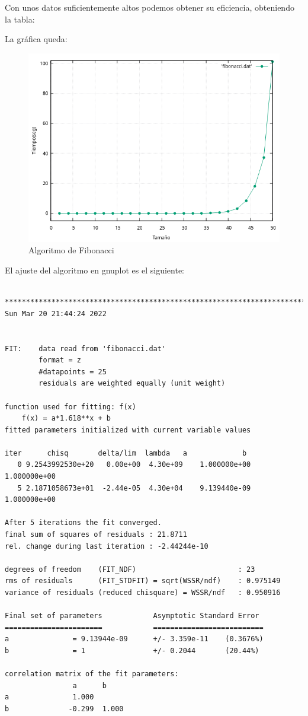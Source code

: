 \documentclass[12pt, spanish]{article}
\begin{document}
Con unos datos suficientemente altos podemos obtener su eficiencia, obteniendo la tabla:



\newpage

La gráfica queda:
\begin{figure}[H]
  \centering
  \includegraphics[scale = 1]{fibonacci.png}
  \caption{Algoritmo de Fibonacci}
\end{figure}

\newpage

El ajuste del algoritmo en gnuplot es el siguiente:

\begin{verbatim}

*************************************************************************
Sun Mar 20 21:44:24 2022


FIT:    data read from 'fibonacci.dat'
        format = z
        #datapoints = 25
        residuals are weighted equally (unit weight)

function used for fitting: f(x)
	f(x) = a*1.618**x + b
fitted parameters initialized with current variable values

iter      chisq       delta/lim  lambda   a             b
   0 9.2543992530e+20   0.00e+00  4.30e+09    1.000000e+00   1.000000e+00
   5 2.1871058673e+01  -2.44e-05  4.30e+04    9.139440e-09   1.000000e+00

After 5 iterations the fit converged.
final sum of squares of residuals : 21.8711
rel. change during last iteration : -2.44244e-10

degrees of freedom    (FIT_NDF)                        : 23
rms of residuals      (FIT_STDFIT) = sqrt(WSSR/ndf)    : 0.975149
variance of residuals (reduced chisquare) = WSSR/ndf   : 0.950916

Final set of parameters            Asymptotic Standard Error
=======================            ==========================
a               = 9.13944e-09      +/- 3.359e-11    (0.3676%)
b               = 1                +/- 0.2044       (20.44%)

correlation matrix of the fit parameters:
                a      b
a               1.000
b              -0.299  1.000
\end{verbatim}
\end{document}
